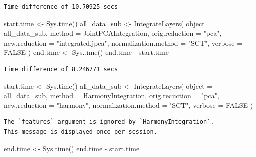 \documentclass[
  letterpaper,
  DIV=11,
  numbers=noendperiod]{scrreprt}
\newenvironment{Shaded}{\begin{snugshade}}{\end{snugshade}}
\newcommand{\AttributeTok}[1]{\textcolor[rgb]{0.40,0.45,0.13}{#1}}
\newcommand{\ConstantTok}[1]{\textcolor[rgb]{0.56,0.35,0.01}{#1}}
\newcommand{\FunctionTok}[1]{\textcolor[rgb]{0.28,0.35,0.67}{#1}}
\newcommand{\NormalTok}[1]{\textcolor[rgb]{0.00,0.23,0.31}{#1}}
\newcommand{\OtherTok}[1]{\textcolor[rgb]{0.00,0.23,0.31}{#1}}
\newcommand{\SpecialCharTok}[1]{\textcolor[rgb]{0.37,0.37,0.37}{#1}}
\newcommand{\StringTok}[1]{\textcolor[rgb]{0.13,0.47,0.30}{#1}}
\begin{document}
\begin{verbatim}
Time difference of 10.70925 secs
\end{verbatim}

\begin{Shaded}
\begin{Highlighting}[]
\NormalTok{start.time }\OtherTok{\textless{}{-}} \FunctionTok{Sys.time}\NormalTok{()}
\NormalTok{all\_data\_sub }\OtherTok{\textless{}{-}} \FunctionTok{IntegrateLayers}\NormalTok{(}
  \AttributeTok{object =}\NormalTok{ all\_data\_sub, }\AttributeTok{method =}\NormalTok{ JointPCAIntegration,}
  \AttributeTok{orig.reduction =} \StringTok{"pca"}\NormalTok{, }\AttributeTok{new.reduction =} \StringTok{"integrated.jpca"}\NormalTok{, }\AttributeTok{normalization.method =} \StringTok{"SCT"}\NormalTok{,}
  \AttributeTok{verbose =} \ConstantTok{FALSE}
\NormalTok{)}
\NormalTok{end.time }\OtherTok{\textless{}{-}} \FunctionTok{Sys.time}\NormalTok{()}
\NormalTok{end.time }\SpecialCharTok{{-}}\NormalTok{ start.time}
\end{Highlighting}
\end{Shaded}

\begin{verbatim}
Time difference of 8.246771 secs
\end{verbatim}

\begin{Shaded}
\begin{Highlighting}[]
\NormalTok{start.time }\OtherTok{\textless{}{-}} \FunctionTok{Sys.time}\NormalTok{()}
\NormalTok{all\_data\_sub }\OtherTok{\textless{}{-}} \FunctionTok{IntegrateLayers}\NormalTok{(}
  \AttributeTok{object =}\NormalTok{ all\_data\_sub, }\AttributeTok{method =}\NormalTok{ HarmonyIntegration,}
  \AttributeTok{orig.reduction =} \StringTok{"pca"}\NormalTok{, }\AttributeTok{new.reduction =} \StringTok{"harmony"}\NormalTok{, }\AttributeTok{normalization.method =} \StringTok{"SCT"}\NormalTok{,}
  \AttributeTok{verbose =} \ConstantTok{FALSE}
\NormalTok{)}
\end{Highlighting}
\end{Shaded}

\begin{verbatim}
The `features` argument is ignored by `HarmonyIntegration`.
This message is displayed once per session.
\end{verbatim}

\begin{Shaded}
\begin{Highlighting}[]
\NormalTok{end.time }\OtherTok{\textless{}{-}} \FunctionTok{Sys.time}\NormalTok{()}
\NormalTok{end.time }\SpecialCharTok{{-}}\NormalTok{ start.time}
\end{Highlighting}
\end{Shaded}
\end{document}
